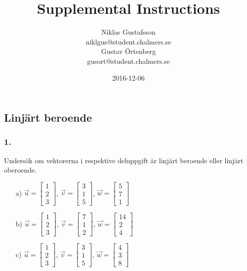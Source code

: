 \documentclass{article}
\title{Supplemental Instructions}
\author{Niklas Gustafsson \\ 
		\small{niklgus@student.chalmers.se} \\
		Gustav Örtenberg \\ 
		\small{gusort@student.chalmers.se}
}
\date{
      2016-12-06
     }
\begin{document}
\maketitle

\subsection*{Linjärt beroende}
\subsubsection*{1.}
Undersök om vektorerna i respektive deluppgift är linjärt beroende eller linjärt oberoende.
\begin{itemize}
	\item[a) ] $\vec{u} = \begin{bmatrix} 1 \\ 2 \\ 3 \end{bmatrix}$, $\vec{v} = \begin{bmatrix} 3 \\ 1 \\ 5 \end{bmatrix}$, $\vec{w} = \begin{bmatrix} 5 \\ 7 \\ 1 \end{bmatrix}$
	\item[b) ] $\vec{u} = \begin{bmatrix} 1 \\ 2 \\ 3 \end{bmatrix}$, $\vec{v} = \begin{bmatrix} 7 \\ 1 \\ 2 \end{bmatrix}$, $\vec{w} = \begin{bmatrix} 14 \\ 2 \\ 4 \end{bmatrix}$
	\item[c) ] $\vec{u} = \begin{bmatrix} 1 \\ 2 \\ 3 \end{bmatrix}$, $\vec{v} = \begin{bmatrix} 3 \\ 1 \\ 5 \end{bmatrix}$, $\vec{w} = \begin{bmatrix} 4 \\ 3 \\ 8 \end{bmatrix}$

\end{itemize}
\end{document}

